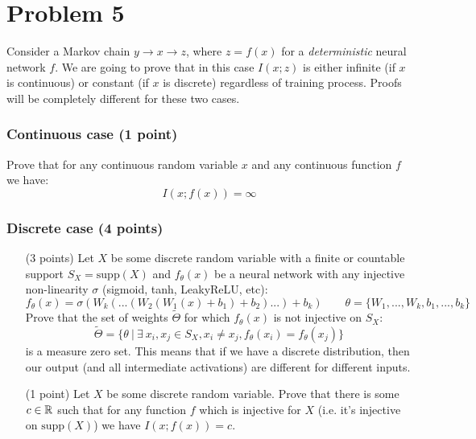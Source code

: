 \documentclass{article}
\begin{document}
\section*{Problem 5}
Consider a Markov chain $y \to x \to z$, where $z = f(x)$ for a \textit{deterministic} neural network $f$.
We are going to prove that in this case $I(x;z)$ is either infinite (if $x$ is continuous) or constant (if $x$ is discrete) regardless of training process.
Proofs will be completely different for these two cases.

\subsubsection*{Continuous case (1 point)}
Prove that for any continuous random variable $x$ and any continuous function $f$ we have:
\[
I(x; f(x)) = \infty
\]

\subsubsection*{Discrete case (4 points)}
\begin{enumerate}
    \item[(3 points)] Let $X$ be some discrete random variable with a finite or countable support $S_X = \text{supp}(X)$ and $f_\theta(x)$ be a neural network with any injective non-linearity $\sigma$ (sigmoid, tanh, LeakyReLU, etc):
\[
f_\theta(x) = \sigma(W_k(...(W_2( W_1(x) + b_1) + b_2)...) + b_k) \qquad \theta = \{W_1, ..., W_k, b_1, ..., b_k \}
\]
Prove that the set of weights $\tilde{\Theta}$ for which $f_\theta(x)$ is not injective on $S_X$:
\[
\tilde{\Theta} = \{ \theta \ |\ \exists\ x_i, x_j \in S_X, x_i \neq x_j, f_\theta(x_i) = f_\theta(x_j) \}
\]
is a measure zero set.
This means that if we have a discrete distribution, then our output (and all intermediate activations) are different for different inputs.

    \item[(1 point)] Let $X$ be some discrete random variable. Prove that there is some $c \in \mathbb{R}$ such that for any function $f$ which is injective for $X$ (i.e. it's injective on $\text{supp}(X)$) we have $I(x; f(x)) = c$.
\end{enumerate}
\end{document}
